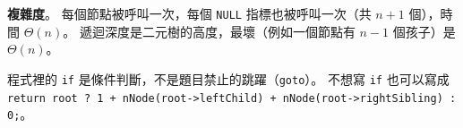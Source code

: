 \begin{pastsoln}
\textbf{複雜度}。 每個節點被呼叫一次，每個 \texttt{NULL} 指標也被呼叫一次（共 $n + 1$ 個），時間
$\Theta(n)$。 遞迴深度是二元樹的高度，最壞（例如一個節點有 $n - 1$ 個孩子）是 $\Theta(n)$。

程式裡的 \texttt{if} 是條件判斷，不是題目禁止的跳躍（\texttt{goto}）。 不想寫 \texttt{if} 也可以寫成
\texttt{return root ? 1 + nNode(root->leftChild) + nNode(root->rightSibling) : 0;}。
\end{pastsoln}
